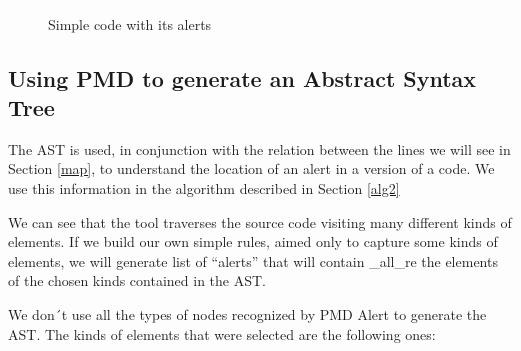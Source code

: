 \documentclass[
]{article}
\begin{document}
\normalsize

\begin{figure}
\centering
\includegraphics{figures/fake.png}
\caption{Simple code with its alerts \label{simple_code}}
\end{figure}

\subsection{Using PMD to generate an Abstract Syntax Tree }\label{ast}

The AST is used, in conjunction with the relation between the lines we
will see in Section \ref{map}, to understand the location of an alert in
a version of a code. We use this information in the algorithm described
in Section \ref{alg2}

We can see that the tool traverses the source code visiting many
different kinds of elements. If we build our own simple rules, aimed
only to capture some kinds of elements, we will generate list of
``alerts'' that will contain \_all\_re the elements of the chosen kinds
contained in the AST.

\newpage

We don´t use all the types of nodes recognized by PMD Alert to generate
the AST. The kinds of elements that were selected are the following
ones:
\end{document}
